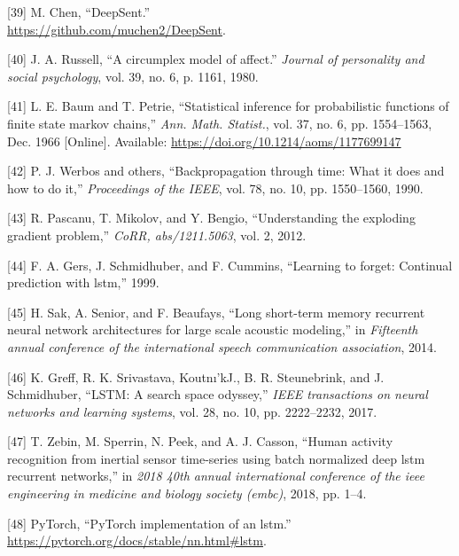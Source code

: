 \documentclass[12pt,]{article}
\begin{document}
\leavevmode\hypertarget{ref-deepsent}{}%
{[}39{]} M. Chen, ``DeepSent.'' \\
\url{https://github.com/muchen2/DeepSent}.

\leavevmode\hypertarget{ref-russell1980circumplex}{}%
{[}40{]} J. A. Russell, ``A circumplex model of affect.'' \emph{Journal
of personality and social psychology}, vol. 39, no. 6, p. 1161, 1980.

\leavevmode\hypertarget{ref-baum1966}{}%
{[}41{]} L. E. Baum and T. Petrie, ``Statistical inference for
probabilistic functions of finite state markov chains,'' \emph{Ann.
Math. Statist.}, vol. 37, no. 6, pp. 1554--1563, Dec. 1966 {[}Online{]}.
Available: \url{https://doi.org/10.1214/aoms/1177699147}

\leavevmode\hypertarget{ref-werbos1990backpropagation}{}%
{[}42{]} P. J. Werbos and others, ``Backpropagation through time: What
it does and how to do it,'' \emph{Proceedings of the IEEE}, vol. 78, no.
10, pp. 1550--1560, 1990.

\leavevmode\hypertarget{ref-pascanu2012understanding}{}%
{[}43{]} R. Pascanu, T. Mikolov, and Y. Bengio, ``Understanding the
exploding gradient problem,'' \emph{CoRR, abs/1211.5063}, vol. 2, 2012.

\leavevmode\hypertarget{ref-gers1999learning}{}%
{[}44{]} F. A. Gers, J. Schmidhuber, and F. Cummins, ``Learning to
forget: Continual prediction with lstm,'' 1999.

\leavevmode\hypertarget{ref-sak2014long}{}%
{[}45{]} H. Sak, A. Senior, and F. Beaufays, ``Long short-term memory
recurrent neural network architectures for large scale acoustic
modeling,'' in \emph{Fifteenth annual conference of the international
speech communication association}, 2014.

\leavevmode\hypertarget{ref-greff2017lstm}{}%
{[}46{]} K. Greff, R. K. Srivastava, Koutnı'kJ., B. R. Steunebrink, and
J. Schmidhuber, ``LSTM: A search space odyssey,'' \emph{IEEE
transactions on neural networks and learning systems}, vol. 28, no. 10,
pp. 2222--2232, 2017.

\leavevmode\hypertarget{ref-zebin2018human}{}%
{[}47{]} T. Zebin, M. Sperrin, N. Peek, and A. J. Casson, ``Human
activity recognition from inertial sensor time-series using batch
normalized deep lstm recurrent networks,'' in \emph{2018 40th annual
international conference of the ieee engineering in medicine and biology
society (embc)}, 2018, pp. 1--4.

\leavevmode\hypertarget{ref-pytorchlstm}{}%
{[}48{]} \relax PyTorch, ``PyTorch implementation of an lstm.'' \\
\url{https://pytorch.org/docs/stable/nn.html\#lstm}.
\end{document}
